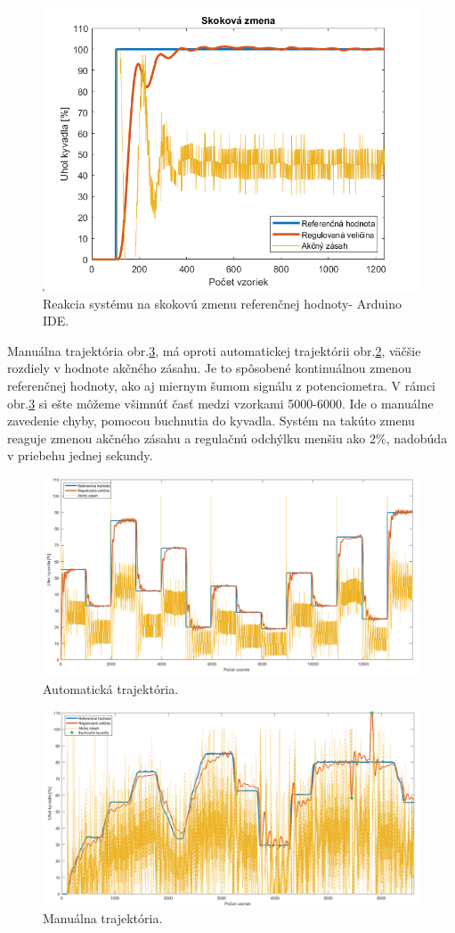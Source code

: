 \begin{figure}[!tbh]
	\centering
	\includegraphics[width=120mm]{obr/SkokovaZmena.png}
	\caption{Reakcia systému na skokovú zmenu referenčnej hodnoty- Arduino IDE.}\label{OBRAZOK 2.5.1}
\end{figure}

Manuálna trajektória obr.\ref{OBRAZOK 2.5.3}, má oproti automatickej trajektórii obr.\ref{OBRAZOK 2.5.2}, väčšie rozdiely v hodnote akčného zásahu. Je to spôsobené kontinuálnou zmenou referenčnej hodnoty, ako aj miernym šumom signálu z potenciometra. V rámci obr.\ref{OBRAZOK 2.5.3} si ešte môžeme všimnúť časť medzi vzorkami 5000-6000. Ide o manuálne zavedenie chyby, pomocou buchnutia do kyvadla. Systém na takúto zmenu reaguje zmenou akčného zásahu a regulačnú odchýlku menšiu ako 2\%, nadobúda v priebehu jednej sekundy. 

\begin{figure}[!tbh]
	\centering
	\includegraphics[width=150mm]{obr/Auto3.png}
	\caption{Automatická trajektória.}\label{OBRAZOK 2.5.2}
\end{figure}

\begin{figure}[!tbh]
	\centering
	\includegraphics[width=150mm]{obr/potentio.png}
	\caption{Manuálna trajektória.}\label{OBRAZOK 2.5.3}
\end{figure}
